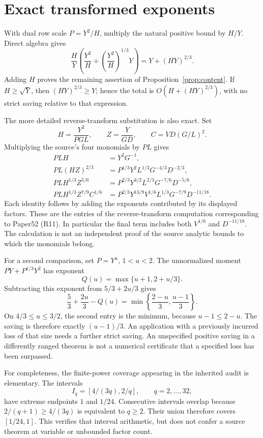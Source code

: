 \documentclass[11pt]{article}
\theoremstyle{remark}\newtheorem{remark}[theorem]{Remark}
\begin{document}
\section{Exact transformed exponents}\label{sec:exponents}

With dual row scale $P=Y^2/H$, multiply the natural positive bound by $H/Y$. Direct algebra gives
\[
\frac HY\left(\frac{Y^2}H+
\left(\frac{Y^2}H\right)^{1/3}Y\right)
=Y+(HY)^{2/3}.
\]
Adding $H$ proves the remaining assertion of Proposition~\ref{prop:content}. If $H\ge\sqrt Y$, then $(HY)^{2/3}\ge Y$; hence the total is $O(H+(HY)^{2/3})$, with no strict saving relative to that expression.

The more detailed reverse-transform substitution is also exact. Set
\[
H=\frac{Y^2}{PGL},\qquad Z=\frac{Y}{GD},\qquad
C=VD(G/L)^2.
\]
Multiplying the source's four monomials by $PL$ gives
\begin{align*}
PLH&=Y^2G^{-1},\\
PL(HZ)^{2/3}&=P^{1/3}Y^2L^{1/3}G^{-4/3}D^{-2/3},\\
PLH^{1/3}Z^{5/6}&=P^{2/3}Y^{3/2}L^{2/3}G^{-7/6}D^{-5/6},\\
PLH^{1/3}Z^{7/9}C^{1/6}
&=P^{2/3}Y^{13/9}V^{1/6}L^{1/3}G^{-7/9}D^{-11/18}.
\end{align*}
Each identity follows by adding the exponents contributed by its displayed factors. These are the entries of the reverse-transform computation corresponding to Paper52 (R11). In particular the final term includes both $V^{1/6}$ and $D^{-11/18}$. The calculation is not an independent proof of the source analytic bounds to which the monomials belong.

For a second comparison, set $P=Y^u$, $1<u<2$. The unnormalized moment $PY+P^{1/3}Y^2$ has exponent
\[
Q(u)=\max\{u+1,2+u/3\}.
\]
Subtracting this exponent from $5/3+2u/3$ gives
\[
\frac53+\frac{2u}3-Q(u)
=\min\left\{\frac{2-u}3,\frac{u-1}3\right\}.
\]
On $4/3\le u\le3/2$, the second entry is the minimum, because $u-1\le2-u$. The saving is therefore exactly $(u-1)/3$. An application with a previously incurred loss of that size needs a further strict saving. An unspecified positive saving in a differently ranged theorem is not a numerical certificate that a specified loss has been surpassed.

For completeness, the finite-power coverage appearing in the inherited audit is elementary. The intervals
\[
I_q=[4/(3q),2/q],\qquad q=2,\ldots,32,
\]
have extreme endpoints $1$ and $1/24$. Consecutive intervals overlap because $2/(q+1)\ge4/(3q)$ is equivalent to $q\ge2$. Their union therefore covers $[1/24,1]$. This verifies that interval arithmetic, but does not confer a source theorem at variable or unbounded factor count.
\end{document}
